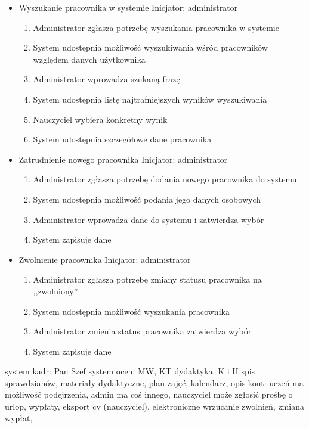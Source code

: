 \documentclass{article}
\begin{document}
\begin{itemize}
\item Wyszukanie pracownika w systemie
Inicjator: administrator
\begin{enumerate}
\item Administrator zgłasza potrzebę wyszukania pracownika w systemie
\item System udostępnia możliwość wyszukiwania wśród pracowników względem danych użytkownika
\item Administrator wprowadza szukaną frazę
\item System udostępnia listę najtrafniejszych wyników wyszukiwania
\item Nauczyciel wybiera konkretny wynik
\item System udostępnia szczegółowe dane pracownika
\end{enumerate}

\item Zatrudnienie nowego pracownika
Inicjator: administrator
\begin{enumerate}
\item Administrator zgłasza potrzebę dodania nowego pracownika do systemu
\item System udostępnia możliwość podania jego danych osobowych
\item Administrator wprowadza dane do systemu i zatwierdza wybór
\item System zapisuje dane
\end{enumerate}
\item Zwolnienie pracownika
Inicjator: administrator
\begin{enumerate}
\item Administrator zgłasza potrzebę zmiany statusu pracownika na ,,zwolniony''
\item System udostępnia możliwość wyszukania pracownika
\item Administrator zmienia status pracownika zatwierdza wybór
\item System zapisuje dane
\end{enumerate}
\end{itemize}









system kadr: Pan Szef
system ocen: MW, KT
dydaktyka: K i H spis sprawdzianów, materiały dydaktyczne, plan zajęć, kalendarz, opis kont: uczeń ma możliwość podejrzenia, admin ma coś innego, nauczyciel może zgłosić prośbę o urlop, wypłaty, eksport cv (nauczyciel), elektroniczne wrzucanie zwolnień, zmiana wypłat,
\end{document}
